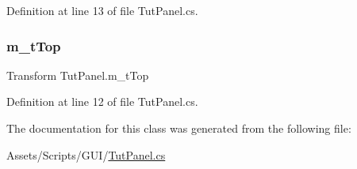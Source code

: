 Definition at line 13 of file Tut\+Panel.\+cs.

\mbox{\label{class_tut_panel_a58404ecfd155e75dd7c296fe4a581d81}} 
\subsubsection{\texorpdfstring{m\+\_\+t\+Top}{m\_tTop}}
{\footnotesize\ttfamily Transform Tut\+Panel.\+m\+\_\+t\+Top}



Definition at line 12 of file Tut\+Panel.\+cs.



The documentation for this class was generated from the following file\+:\begin{DoxyCompactItemize}
\item 
Assets/\+Scripts/\+G\+U\+I/\mbox{\hyperlink{_tut_panel_8cs}{Tut\+Panel.\+cs}}\end{DoxyCompactItemize}

